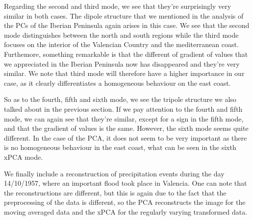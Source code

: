 \documentclass[11pt, oneside]{book}
\theoremstyle{plain}
\theoremstyle{remark}
\begin{document}
Regarding the second and third mode, we see that they're surprisingly very
similar in both cases. The dipole structure that we mentioned in the analysis of
the PCs of the Iberian Peninsula again arises in this case. We see that the
second mode distinguishes between the north and south regions while the third
mode focuses on the interior of the Valencian Country and the mediterranean
coast. Furthemore, something remarkable is that the different of gradient of
values that we appreciated in the Iberian Peninsula now has disappeared and
they're very similar. We note that third mode will therefore have a higher
importance in our case, as it clearly differentiates a homogeneous behaviour on
the east coast.

So as to the fourth, fifth and sixth mode, we see the tripole structure we also
talked about in the previous section. If we pay attention to the fourth and
fifth mode, we can again see that they're similar, except for a sign in the
fifth mode, and that the gradient of values is the same. However, the sixth mode
seems quite different. In the case of the PCA, it does not seem to be very
important as there is no homogeneous behaviour in the east coast, what can be
seen in the sixth xPCA mode. 

We finally include a reconstruction of precipitation events during the day
14/10/1957, where an important flood took place in Valencia. One can note that
the reconstructions are different, but this is again due to the fact that the
preprocessing of the data is different, so the PCA reconstructs the image for
the moving averaged data and the xPCA for the regularly varying transformed
data.
\end{document}
